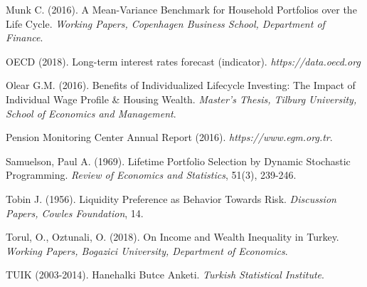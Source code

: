 \begin{description}
\item Munk C. (2016). A Mean-Variance Benchmark for Household Portfolios over the Life Cycle. \textit{Working Papers, Copenhagen Business School, Department of Finance}.
\item OECD (2018). Long-term interest rates forecast (indicator). \textit{https://data.oecd.org}
\item Olear G.M. (2016). Benefits of Individualized Lifecycle Investing: The Impact of Individual Wage Profile \& Housing Wealth. \textit{Master's Thesis, Tilburg University, School of Economics and Management}.
\item Pension Monitoring Center Annual Report (2016). \textit{https://www.egm.org.tr}.
\item Samuelson, Paul A. (1969). Lifetime Portfolio Selection by Dynamic Stochastic Programming. \textit{Review of Economics and Statistics}, 51(3), 239-246.
\item Tobin J. (1956). Liquidity Preference as Behavior Towards Risk. \textit{Discussion Papers, Cowles Foundation}, 14.
\item Torul, O., Oztunali, O. (2018). On Income and Wealth Inequality in Turkey. \textit{Working Papers, Bogazici University, Department of Economics}.
\item TUIK (2003-2014). Hanehalki Butce Anketi. \textit{Turkish Statistical Institute}.
\end{description}
\endgroup

